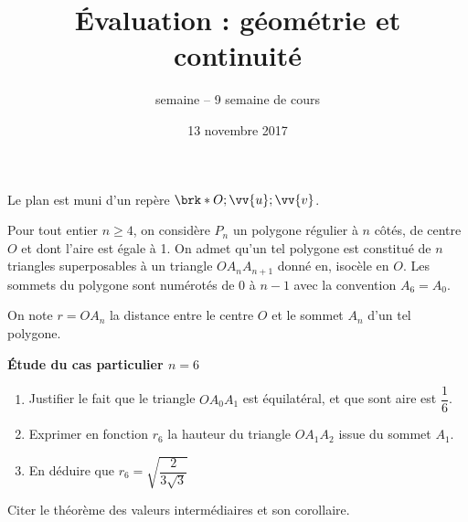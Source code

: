 \documentclass[a4paper,12pt,frenchb]{article}
\title{Évaluation : géométrie et continuité}
\author{semaine \no{45} -- 9\up{ieme} semaine de cours}
\date{13 novembre 2017}
\begin{document}
\maketitle

\thispagestyle{fancy}

\begin{question}[subtitle={13 juin 2017, centres étrangers, 2 points}]
  Le plan est muni d'un repère $\brk*{O ; \vv{u}; \vv{v}}$.

  Pour tout entier $n ≥ 4$, on considère $P_n$ un polygone régulier à $n$
  côtés, de centre $O$ et dont l'aire est égale à 1. On admet qu'un tel
  polygone est constitué de $n$ triangles superposables à un triangle
  $OA_nA_{n+1}$ donné en, isocèle en $O$. Les sommets du polygone sont
  numérotés de 0 à $n-1$ avec la convention $A_6 = A_0$.

  On note $r = OA_n$ la distance entre le centre $O$ et le sommet $A_n$ d'un
  tel polygone.

  \bigskip
  \textbf{Étude du cas particulier $n=6$}
  \medskip

  \begin{enumerate}
    \item Justifier le fait que le triangle $OA_0A_1$ est équilatéral, et
      que sont aire est $\dfrac16$.
    \item Exprimer en fonction $r_6$ la hauteur du triangle $OA_1A_2$ issue
      du sommet $A_1$.
    \item En déduire que $r_6 = \sqrt{\dfrac{2}{3\sqrt{3}}}$
  \end{enumerate}
\end{question}

\begin{question}
  Citer le théorème des valeurs intermédiaires et son corollaire.
\end{question}
\end{document}
